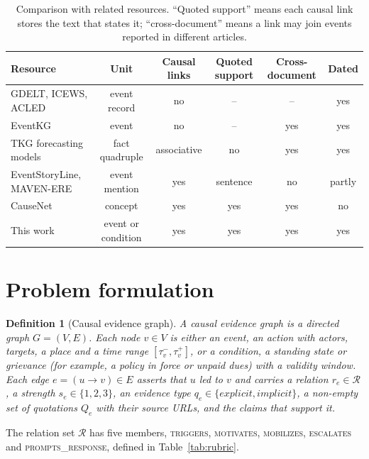 \documentclass[pdflatex,sn-basic,lineno]{sn-jnl}
\theoremstyle{thmstylethree}
\newtheorem{definition}{Definition}
\theoremstyle{thmstyleone}
\newcommand{\rel}[1]{\textsc{#1}}
\begin{document}
\begin{table}[!htbp]
\caption{Comparison with related resources. ``Quoted support'' means each causal link stores the
text that states it; ``cross-document'' means a link may join events reported in different
articles.}
\label{tab:compare}
\footnotesize
\begin{tabularx}{\textwidth}{@{}Xccccc@{}}
\toprule
Resource & Unit & Causal links & Quoted support & Cross-document & Dated \\
\midrule
GDELT, ICEWS, ACLED \citep{gdelt,icews,acled} & event record & no & -- & -- & yes \\
EventKG \citep{eventkg} & event & no & -- & yes & yes \\
TKG forecasting models \citep{renet,tlogic,csi} & fact quadruple & associative & no & yes & yes \\
EventStoryLine, MAVEN-ERE \citep{storyline,mavenere} & event mention & yes & sentence & no & partly \\
CauseNet \citep{causenet} & concept & yes & yes & yes & no \\
This work & event or condition & yes & yes & yes & yes \\
\bottomrule
\end{tabularx}
\end{table}

\section{Problem formulation}\label{sec:problem}

\begin{definition}[Causal evidence graph]
A causal evidence graph is a directed graph $G=(V,E)$. Each node $v\in V$ is either an
\emph{event}, an action with actors, targets, a place and a time range $[\tau^-_v,\tau^+_v]$, or a
\emph{condition}, a standing state or grievance (for example, a policy in force or unpaid dues)
with a validity window. Each edge $e=(u\rightarrow v)\in E$ asserts that $u$ led to $v$ and carries
a relation $r_e\in\mathcal{R}$, a strength $s_e\in\{1,2,3\}$, an evidence type
$q_e\in\{\textit{explicit},\textit{implicit}\}$, a non-empty set of quotations $Q_e$ with their
source URLs, and the claims that support it.
\end{definition}

The relation set $\mathcal{R}$ has five members, \rel{triggers}, \rel{motivates},
\rel{mobilizes}, \rel{escalates} and \rel{prompts\_response}, defined in
Table~\ref{tab:rubric}.
\end{document}
